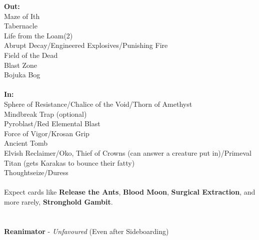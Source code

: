 \documentclass{report}
\begin{document}
\textbf{Out:}\\
Maze of Ith\\Tabernacle\\Life from the Loam(2)\\Abrupt Decay/Engineered Explosives/Punishing Fire\\Field of the Dead\\Blast Zone\\Bojuka Bog\\\\
\textbf{In:}\\
Sphere of Resistance/Chalice of the Void/Thorn of Amethyst\\Mindbreak Trap (optional)\\Pyroblast/Red Elemental Blast\\Force of Vigor/Krosan Grip\\Ancient Tomb\\Elvish Reclaimer/Oko, Thief of Crowns (can answer a creature put in)/Primeval Titan (gets Karakas to bounce their fatty)\\Thoughtseize/Duress\\\\
Expect cards like \textbf{Release the Ants}, \textbf{Blood Moon}, \textbf{Surgical Extraction}, and more rarely, \textbf{Stronghold Gambit}.\\\\\\
\textbf{Reanimator} - \emph{Unfavoured} (Even after Sideboarding)\\
\end{document}
